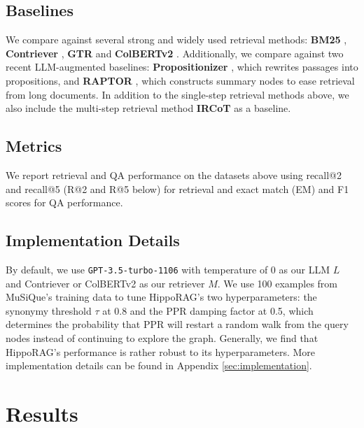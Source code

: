 \documentclass{article}
\begin{document}
\subsection{Baselines}

We compare against several strong and widely used retrieval methods: \textbf{BM25} \cite{bm25}, \textbf{Contriever} \cite{contriever}, \textbf{GTR} \cite{gtr} and \textbf{ColBERTv2} \cite{colbertv2}.
Additionally, we compare against two recent LLM-augmented baselines: \textbf{Propositionizer} \cite{densex}, which rewrites passages into propositions, and \textbf{RAPTOR} \cite{raptor}, which constructs summary nodes to ease retrieval from long documents.
In addition to the single-step retrieval methods above, we also include the multi-step retrieval method \textbf{IRCoT} \cite{ircot} as a baseline.

\subsection{Metrics}

We report retrieval and QA performance on the datasets above using recall@2 and recall@5 (R@2 and R@5 below) for retrieval and exact match (EM) and F1 scores for QA performance. 

\subsection{Implementation Details}
\label{implementation_details}

By default, we use \texttt{GPT-3.5-turbo-1106} \cite{openai_gpt_3_5_turbo} with temperature of \num{0} as our LLM $L$ and Contriever \cite{contriever} or ColBERTv2 \cite{colbertv2} as our retriever $M$.
We use \num{100} examples from MuSiQue's training data to tune HippoRAG's two hyperparameters: the synonymy threshold $\tau$ at \num{0.8} and the PPR damping factor at \num{0.5}, which determines the probability that PPR will restart a random walk from the query nodes instead of continuing to explore the graph. 
Generally, we find that HippoRAG's performance is rather robust to its hyperparameters. 
More implementation details can be found in Appendix \ref{sec:implementation}.

\section{Results}
\label{experiment_results}
\end{document}
